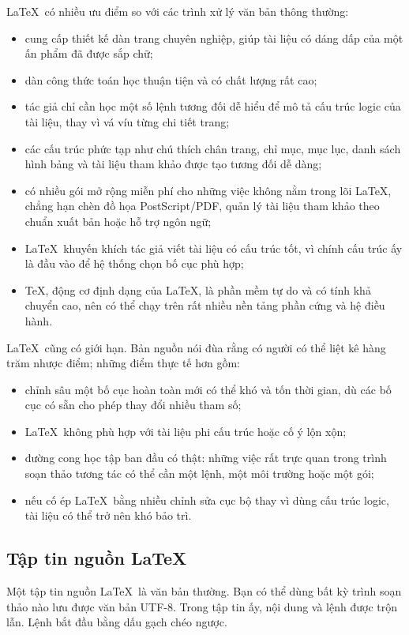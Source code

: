 \documentclass[11pt]{article}
\begin{document}
\LaTeX\ có nhiều ưu điểm so với các trình xử lý văn bản thông thường:
\begin{itemize}
  \item cung cấp thiết kế dàn trang chuyên nghiệp, giúp tài liệu có dáng dấp
  của một ấn phẩm đã được sắp chữ;
  \item dàn công thức toán học thuận tiện và có chất lượng rất cao;
  \item tác giả chỉ cần học một số lệnh tương đối dễ hiểu để mô tả cấu trúc
  logic của tài liệu, thay vì vá víu từng chi tiết trang;
  \item các cấu trúc phức tạp như chú thích chân trang, chỉ mục, mục lục, danh
  sách hình bảng và tài liệu tham khảo được tạo tương đối dễ dàng;
  \item có nhiều gói mở rộng miễn phí cho những việc không nằm trong lõi
  \LaTeX, chẳng hạn chèn đồ họa PostScript/PDF, quản lý tài liệu tham khảo
  theo chuẩn xuất bản hoặc hỗ trợ ngôn ngữ;
  \item \LaTeX\ khuyến khích tác giả viết tài liệu có cấu trúc tốt, vì chính
  cấu trúc ấy là đầu vào để hệ thống chọn bố cục phù hợp;
  \item \TeX, động cơ định dạng của \LaTeX, là phần mềm tự do và có tính khả
  chuyển cao, nên có thể chạy trên rất nhiều nền tảng phần cứng và hệ điều hành.
\end{itemize}

\LaTeX\ cũng có giới hạn. Bản nguồn nói đùa rằng có người có thể liệt kê hàng
trăm nhược điểm; những điểm thực tế hơn gồm:
\begin{itemize}
  \item chỉnh sâu một bố cục hoàn toàn mới có thể khó và tốn thời gian, dù các
  bố cục có sẵn cho phép thay đổi nhiều tham số;
  \item \LaTeX\ không phù hợp với tài liệu phi cấu trúc hoặc cố ý lộn xộn;
  \item đường cong học tập ban đầu có thật: những việc rất trực quan trong
  trình soạn thảo tương tác có thể cần một lệnh, một môi trường hoặc một gói;
  \item nếu cố ép \LaTeX\ bằng nhiều chỉnh sửa cục bộ thay vì dùng cấu trúc
  logic, tài liệu có thể trở nên khó bảo trì.
\end{itemize}

\subsection{Tập tin nguồn \LaTeX}

Một tập tin nguồn \LaTeX\ là văn bản thường. Bạn có thể dùng bất kỳ trình soạn
thảo nào lưu được văn bản UTF-8. Trong tập tin ấy, nội dung và lệnh được trộn
lẫn. Lệnh bắt đầu bằng dấu gạch chéo ngược.
\end{document}
